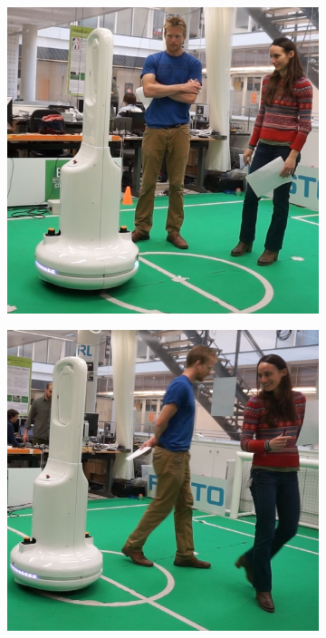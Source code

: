 \documentclass[letterpaper, 10 pt, conference]{ieeeconf}
\begin{document}
  \begin{figure}[t]
      \begin{subfigure}[b]{0.39\columnwidth}
    \includegraphics[scale = 0.099]{images/grp.jpg}
    \caption{}
    \label{fig:static}
  \end{subfigure}
  \hspace{7mm}
  \begin{subfigure}[b]{0.39\columnwidth}
  \hspace{1mm}
    \includegraphics[scale = 0.087]{images/fol.jpg}

\end{subfigure}
\end{figure}
\end{document}
